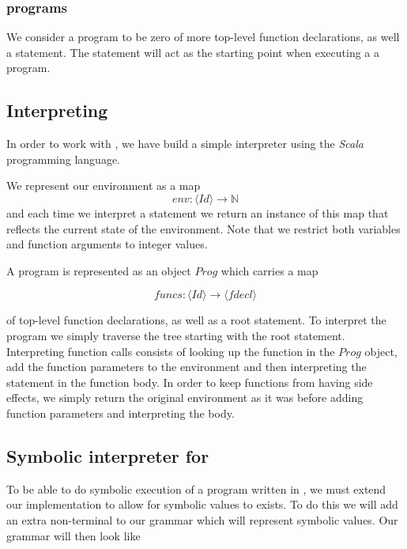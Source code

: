 \fi

\subsubsection{programs}

We consider a program to be zero of more top-level function declarations, as well a statement. The statement will act as the starting point when executing a a program. 
\subsection{Interpreting \simpl}

In order to work with \simpl, we have build a simple interpreter using the \emph{Scala} programming language.

 We represent our environment as a map 
\begin{equation}
	env: \langle Id \rangle   \rightarrow \mathbb{N}
\end{equation}
and each time we interpret a statement we return an instance of this map that reflects the current state of the environment. Note that we restrict both variables and function arguments to integer values. 

A program is represented as an object $Prog$ which carries a map

\begin{equation*}
	funcs: \langle Id \rangle \rightarrow \langle fdecl \rangle
\end{equation*}

of top-level function declarations, as well as a root statement. To interpret the program we simply traverse the tree starting with the root statement. Interpreting function calls consists of looking up the function in the $Prog$ object, add the function parameters to the environment and then interpreting the statement in the function body. In order to keep functions from having side effects, we simply return the original environment as it was before adding function parameters and interpreting the body. 

\subsection{Symbolic interpreter for \simpl}

To be able to do symbolic execution of a program written in \simpl, we must extend our implementation to allow for symbolic values to exists. To do this we 
will add an extra non-terminal to our grammar which will represent symbolic values. Our grammar will then look like 

